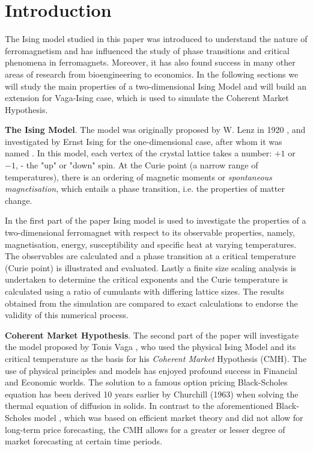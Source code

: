\newpage
\section{Introduction}

The Ising model studied in this paper was introduced to understand the nature of ferromagnetism and has influenced the study of phase transitions and critical phenomena in ferromagnets. Moreover, it has also found success in many other areas of research from bioengineering to economics. In the following sections we will study the main properties of a two-dimensional Ising Model and will build an extension for Vaga-Ising case, which is used to simulate the Coherent Market Hypothesis. 


\textbf{The Ising Model}. The model was originally proposed by W. Lenz in 1920 \cite{lenz}, and investigated by Ernst Ising for the one-dimensional case, after whom it was named \cite{ising}. In this model, each vertex of the crystal lattice takes a number: $+1$ or $-1$, - the "up" or "down" spin. At the Curie point (a narrow range of temperatures), there is an ordering of magnetic moments or \textit{spontaneous magnetisation}, which entails a phase transition, i.e. the properties of matter change.

In the first part of the paper Ising model is used to investigate the properties of a two-dimensional ferromagnet with respect to its observable properties, namely, magnetisation, energy, susceptibility and specific heat at varying temperatures. The observables are calculated and a phase transition at a critical temperature (Curie point) is illustrated and evaluated. Lastly a finite size scaling analysis is undertaken to determine the critical exponents and the Curie temperature is calculated using a ratio of cumulants with differing lattice sizes. The results obtained from the simulation are compared to exact calculations to endorse the validity of this numerical process.


\textbf{Coherent Market Hypothesis}. The second part of the paper will investigate the model proposed by Tonis Vaga \cite{vaga}, who used the physical Ising Model and its critical temperature as the basis for his \textit{Coherent Market} Hypothesis (CMH). The use of physical principles and models has enjoyed profound success in Financial and Economic worlds. The solution to a famous option pricing Black-Scholes equation has been derived 10 years earlier by Churchill (1963) \cite{churchill} when solving the thermal equation of diffusion in solids. In contrast to the aforementioned Black-Scholes model \cite{black}, which was based on efficient market theory and did not allow for long-term price forecasting, the CMH allows for a greater or lesser degree of market forecasting at certain time periods. 

